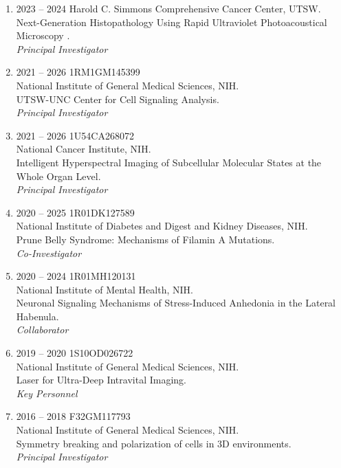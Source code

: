 \documentclass[10pt]{res}
\begin{document}
\begin{resume}
\begin{enumerate}
\item 2023 -- 2024 
\hspace{8pt}
Harold C. Simmons Comprehensive Cancer Center, UTSW. \\
Next-Generation Histopathology Using Rapid Ultraviolet Photoacoustical Microscopy . \\
{\it Principal Investigator}


\item 2021 -- 2026 
\hspace{8pt}
1RM1GM145399 \\ 
National Institute of General Medical Sciences, NIH. \\
UTSW-UNC Center for Cell Signaling Analysis. \\
{\it Principal Investigator}

\item 2021 -- 2026 
\hspace{8pt}
1U54CA268072 \\ 
National Cancer Institute, NIH. \\
Intelligent Hyperspectral Imaging of Subcellular Molecular States at the Whole Organ Level. \\
{\it Principal Investigator}

\item 2020 -- 2025 
\hspace{8pt} 
1R01DK127589 \\
National Institute of Diabetes and Digest and Kidney Diseases, NIH. \\
Prune Belly Syndrome: Mechanisms of Filamin A Mutations. \\
{\it Co-Investigator} 

\item 2020 -- 2024
\hspace{8pt} 
1R01MH120131 \\ 
National Institute of Mental Health, NIH. \\
Neuronal Signaling Mechanisms of Stress-Induced Anhedonia in the Lateral Habenula. \\
{\it Collaborator}

\item 2019 -- 2020 
\hspace{8pt} 
1S10OD026722 \\
National Institute of General Medical Sciences, NIH. \\
Laser for Ultra-Deep Intravital Imaging.\\
{\it Key Personnel}

\item 2016 -- 2018 
\hspace{8pt} 
F32GM117793 \\
National Institute of General Medical Sciences, NIH. \\
Symmetry breaking and polarization of cells in 3D environments. \\
{\it Principal Investigator} 


\end{enumerate}
\end{resume}
\end{document}
